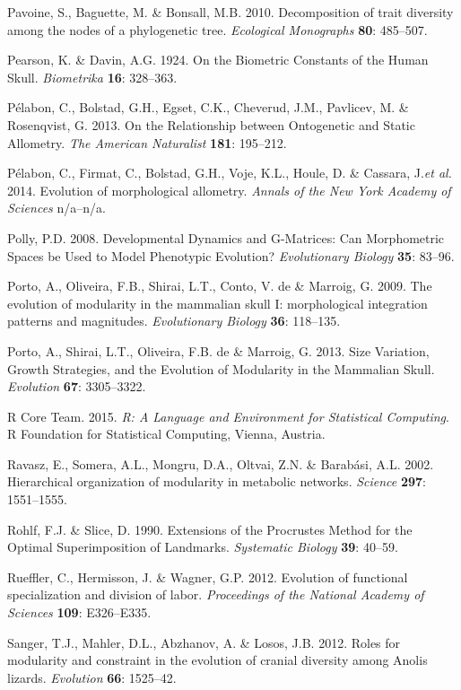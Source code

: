 \documentclass[11pt,twoside]{report}
\begin{document}
Pavoine, S., Baguette, M. \& Bonsall, M.B. 2010. Decomposition of trait
diversity among the nodes of a phylogenetic tree. \emph{Ecological
Monographs} \textbf{80}: 485--507.

Pearson, K. \& Davin, A.G. 1924. On the Biometric Constants of the Human
Skull. \emph{Biometrika} \textbf{16}: 328--363.

Pélabon, C., Bolstad, G.H., Egset, C.K., Cheverud, J.M., Pavlicev, M. \&
Rosenqvist, G. 2013. On the Relationship between Ontogenetic and Static
Allometry. \emph{The American Naturalist} \textbf{181}: 195--212.

Pélabon, C., Firmat, C., Bolstad, G.H., Voje, K.L., Houle, D. \&
Cassara, J.\emph{et al.} 2014. Evolution of morphological allometry.
\emph{Annals of the New York Academy of Sciences} n/a--n/a.

Polly, P.D. 2008. Developmental Dynamics and G-Matrices: Can
Morphometric Spaces be Used to Model Phenotypic Evolution?
\emph{Evolutionary Biology} \textbf{35}: 83--96.

Porto, A., Oliveira, F.B., Shirai, L.T., Conto, V. de \& Marroig, G.
2009. The evolution of modularity in the mammalian skull I:
morphological integration patterns and magnitudes. \emph{Evolutionary
Biology} \textbf{36}: 118--135.

Porto, A., Shirai, L.T., Oliveira, F.B. de \& Marroig, G. 2013. Size
Variation, Growth Strategies, and the Evolution of Modularity in the
Mammalian Skull. \emph{Evolution} \textbf{67}: 3305--3322.

R Core Team. 2015. \emph{R: A Language and Environment for Statistical
Computing}. R Foundation for Statistical Computing, Vienna, Austria.

Ravasz, E., Somera, A.L., Mongru, D.A., Oltvai, Z.N. \& Barabási, A.L.
2002. Hierarchical organization of modularity in metabolic networks.
\emph{Science} \textbf{297}: 1551--1555.

Rohlf, F.J. \& Slice, D. 1990. Extensions of the Procrustes Method for
the Optimal Superimposition of Landmarks. \emph{Systematic Biology}
\textbf{39}: 40--59.

Rueffler, C., Hermisson, J. \& Wagner, G.P. 2012. Evolution of
functional specialization and division of labor. \emph{Proceedings of
the National Academy of Sciences} \textbf{109}: E326--E335.

Sanger, T.J., Mahler, D.L., Abzhanov, A. \& Losos, J.B. 2012. Roles for
modularity and constraint in the evolution of cranial diversity among
Anolis lizards. \emph{Evolution} \textbf{66}: 1525--42.
\end{document}
